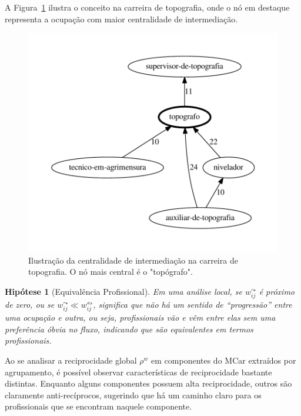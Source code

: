\documentclass[12pt,a4paper]{article}
\theoremstyle{hypo}
\newtheorem{hypothesis}{Hipótese}
\newcommand{\weighted}[1]{#1^w} %
\newcommand{\recout}[1]{#1^\leadsto} %
\newcommand{\recboth}[1]{#1^\leftrightsquigarrow} %
\begin{document}

A Figura~\ref{fig:carreira-topografia} ilustra o conceito na carreira de topografia, onde o nó em destaque representa a ocupação com maior centralidade de intermediação.

\begin{figure}[ht]
  \centering
  \includegraphics[scale=0.6]{cluster_25.pdf}
  \caption{Ilustração da centralidade de intermediação na carreira de topografia. O nó mais central é o "topógrafo".}
  \label{fig:carreira-topografia}
\end{figure}

\begin{hypothesis}[Equivalência Profissional] \label{hip:equivalencia}
Em uma análise local, se $\recout{w}_{ij}$ é próximo de zero, ou se $\recout{w}_{ij} \ll \recboth{w}_{ij}$, significa que não há um sentido de \enquote{progressão} entre uma ocupação e outra, ou seja, profissionais vão e vêm entre elas sem uma preferência óbvia no fluxo, indicando que são equivalentes em termos profissionais.
\end{hypothesis}

Ao se analisar a reciprocidade global $\weighted{\rho}$ em componentes do MCar extraídos por agrupamento, é possível observar características de reciprocidade bastante distintas. Enquanto alguns componentes possuem alta reciprocidade, outros são claramente anti-recíprocos, sugerindo que há um caminho claro para os profissionais que se encontram naquele componente.
\end{document}
